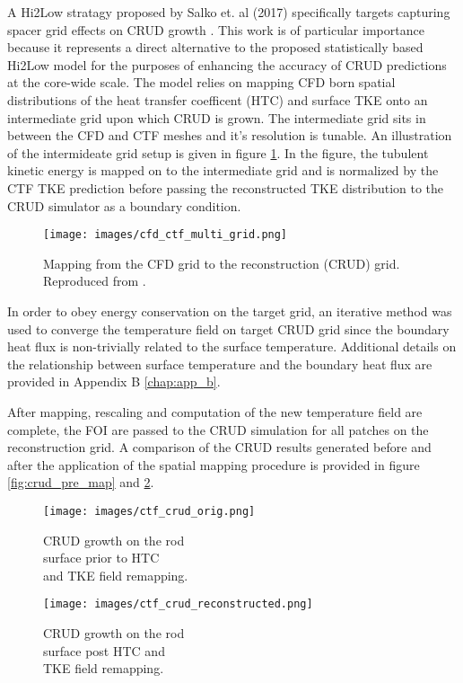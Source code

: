 A Hi2Low stratagy proposed by Salko et. al (2017) specifically targets capturing spacer grid effects on CRUD growth \cite{salko17}.  This work is of particular importance because it represents a direct alternative to the proposed statistically based Hi2Low model for the purposes of enhancing the accuracy of CRUD predictions at the core-wide scale.  The model relies on mapping CFD born spatial distributions of the heat transfer coefficent (HTC) and surface TKE onto an intermediate grid upon which CRUD is grown.  The intermediate grid sits in between the CFD and CTF meshes and it's resolution is tunable.  An illustration of the intermideate grid setup is given in figure \ref{fig:cfd2ctf_map}.  In the figure, the tubulent kinetic energy is mapped on to the intermediate grid and is normalized by the CTF TKE prediction before passing the reconstructed TKE distribution to the CRUD simulator as a boundary condition. 

\begin{figure}[!htbp]
\centering
\texttt{[image: images/cfd\_ctf\_multi\_grid.png]}
\caption{Mapping from the CFD grid to the reconstruction (CRUD) grid.  Reproduced from \cite{salko17}.}
\label{fig:cfd2ctf_map}
\end{figure}

In order to obey energy conservation on the target grid,  an iterative method was used to converge the temperature field on target CRUD grid since the boundary heat flux is non-trivially related to the surface temperature.  Additional details on the relationship between surface temperature and the boundary heat flux are provided in Appendix B \ref{chap:app_b}.

After mapping, rescaling and computation of the new temperature field are complete, the FOI are passed to the CRUD simulation for all patches on the reconstruction grid.  A comparison of the CRUD results generated before and after the application of the spatial mapping procedure is provided in figure \ref{fig:crud_pre_map} and \ref{fig:crud_post_map}.

\begin{figure}[!htbp]
\centering
\begin{minipage}{.45\textwidth}
  \texttt{[image: images/ctf\_crud\_orig.png]}
\caption{CRUD growth on the rod \\ surface prior to HTC \\ and TKE field remapping.}
\label{fig:crud_pre_map}
\end{minipage}%
\begin{minipage}{.45\textwidth}
  \texttt{[image: images/ctf\_crud\_reconstructed.png]}
\caption{CRUD growth on the rod \\ surface post HTC and \\ TKE field remapping.}
\label{fig:crud_post_map}
\end{minipage}
\end{figure}

